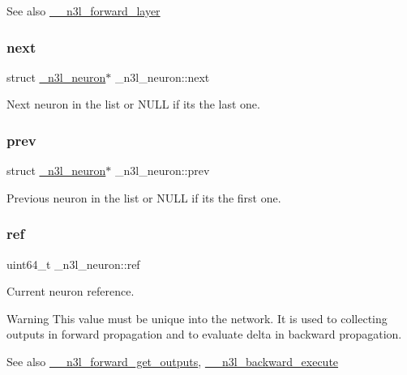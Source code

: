\begin{DoxySeeAlso}{See also}
\hyperlink{n3__forward_8c_a658e97e1260b05ef3d286fbe93f11a40}{\+\_\+\+\_\+n3l\+\_\+forward\+\_\+layer} 
\end{DoxySeeAlso}
\mbox{\label{struct__n3l__neuron_a55f1bc3d589d69c5a940d0cb497610c4}} 
\subsubsection{\texorpdfstring{next}{next}}
{\footnotesize\ttfamily struct \hyperlink{struct__n3l__neuron}{\+\_\+n3l\+\_\+neuron}$\ast$ \+\_\+n3l\+\_\+neuron\+::next}

Next neuron in the list or N\+U\+LL if it\textquotesingle{}s the last one. \mbox{\label{struct__n3l__neuron_a706ad4614fd4d1bd9a824f6ea8c0c9e5}} 
\subsubsection{\texorpdfstring{prev}{prev}}
{\footnotesize\ttfamily struct \hyperlink{struct__n3l__neuron}{\+\_\+n3l\+\_\+neuron}$\ast$ \+\_\+n3l\+\_\+neuron\+::prev}

Previous neuron in the list or N\+U\+LL if it\textquotesingle{}s the first one. \mbox{\label{struct__n3l__neuron_aa0053e003b954df3b58853f003284958}} 
\subsubsection{\texorpdfstring{ref}{ref}}
{\footnotesize\ttfamily uint64\+\_\+t \+\_\+n3l\+\_\+neuron\+::ref}

Current neuron reference. \begin{DoxyWarning}{Warning}
This value must be unique into the network. It is used to collecting outputs in forward propagation and to evaluate delta in backward propagation.
\end{DoxyWarning}
\begin{DoxySeeAlso}{See also}
\hyperlink{n3__forward_8c_ac55d957c2a3b754387f5037e87317870}{\+\_\+\+\_\+n3l\+\_\+forward\+\_\+get\+\_\+outputs}, \hyperlink{n3__backward_8c_accf39951eeeca43985b286831dd397ce}{\+\_\+\+\_\+n3l\+\_\+backward\+\_\+execute} 
\end{DoxySeeAlso}
\mbox{\label{struct__n3l__neuron_afc9c38f4676dbe2ead749f8b6c81f491}} 
